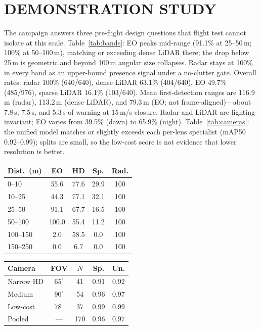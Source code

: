 \documentclass{wscposterproc}
\begin{document}
\section{DEMONSTRATION STUDY}
\label{sec:results}
The campaign answers three pre-flight design questions that flight test cannot isolate at this scale.
Table~\ref{tab:bands}: EO peaks mid-range (91.1\% at 25--50\,m; 100\% at 50--100\,m), matching or exceeding dense LiDAR there; the drop below 25\,m is geometric and beyond 100\,m angular size collapses.
Radar stays at 100\% in every band as an upper-bound presence signal under a no-clutter gate.
Overall rates: radar 100\% (640/640), dense LiDAR 63.1\% (404/640), EO 49.7\% (485/976), sparse LiDAR 16.1\% (103/640).
Mean first-detection ranges are 116.9\,m (radar), 113.2\,m (dense LiDAR), and 79.3\,m (EO; not frame-aligned)---about 7.8\,s, 7.5\,s, and 5.3\,s of warning at 15\,m/s closure.
Radar and LiDAR are lighting-invariant; EO varies from 39.5\% (dawn) to 65.9\% (night).
Table~\ref{tab:cameras}: the unified model matches or slightly exceeds each per-lens specialist (mAP50 0.92--0.99); splits are small, so the low-cost score is not evidence that lower resolution is better.

\vspace{-4mm}
\noindent
\begin{minipage}[t]{0.48\textwidth}
\centering
\captionsetup{type=table,font=scriptsize,skip=1pt}
{\scriptsize
\begin{tabular}{@{}lcccc@{}}
\toprule
\textbf{Dist.\ (m)} & \textbf{EO} & \textbf{HD} & \textbf{Sp.} & \textbf{Rad.} \\
\midrule
0--10    & 55.6 & 77.6 & 29.9 & 100 \\
10--25   & 44.3 & 77.1 & 32.1 & 100 \\
25--50   & 91.1 & 67.7 & 16.5 & 100 \\
50--100  &100.0 & 55.4 & 11.2 & 100 \\
100--150 &  2.0 & 58.5 &  0.0 & 100 \\
150--250 &  0.0 &  6.7 &  0.0 & 100 \\
\bottomrule
\end{tabular}}
\caption{Detection rate (\%). EO: 976/30 runs. LiDAR/Radar: 640/29. Radar is return-presence only.}
\label{tab:bands}
\end{minipage}\hfill
\begin{minipage}[t]{0.50\textwidth}
\centering
\captionsetup{type=table,font=scriptsize,skip=1pt}
{\scriptsize
\begin{tabular}{@{}lcccc@{}}
\toprule
\textbf{Camera} & \textbf{FOV} & \textbf{$N$} & \textbf{Sp.} & \textbf{Un.} \\
\midrule
Narrow HD & $65^\circ$ & 41  & 0.91 & 0.92 \\
Medium    & $90^\circ$ & 54  & 0.96 & 0.97 \\
Low-cost  & $78^\circ$ & 37  & 0.99 & 0.99 \\
Pooled    & ---     & 170 & 0.96 & 0.97 \\
\bottomrule
\end{tabular}}
\caption{Per-camera mAP50 (Spec./Unif.). Standard forward is pooled only.}
\label{tab:cameras}
\end{minipage}
\end{document}
